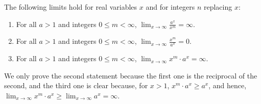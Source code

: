 \begin{tcolorbox}[title=\textcolor{black}{Proof of Prop.~\ref{thm:ExponentialsAreFast} (Exponentials Grow Faster than any Monomial Function)}, sharp corners, colback=green!30, colframe=green!80!blue, %
fonttitle=\bfseries]

The following limits hold for real variables $x$ and for integers $n$ replacing $x$: 
\begin{enumerate}
\renewcommand{\labelenumi}{(\alph{enumi})}
\setlength{\itemsep}{.2cm}
    \item For all $a>1$ and integers $0 \le m < \infty$, $\displaystyle{\lim_{x \to \infty}} \frac{a^x}{x^m} = \infty$.
     \item For all $a > 1$ and integers $0 \le m < \infty$, $\displaystyle{\lim_{x \to \infty}}  \frac{x^m}{a^x} = 0$.
    \item For all $a > 1$ and integers $0 \le m < \infty$, $\displaystyle{\lim_{x \to \infty}}  {x^m} \cdot {a^x} = \infty$.
\end{enumerate}
\end{tcolorbox}

\bigskip

We only prove the second statement because the first one is the reciprocal of the second, and the third one is clear because, for $x>1$, $ {x^m} \cdot {a^x} \ge a^x$, and hence, $\displaystyle{\lim_{x \to \infty}}  {x^m} \cdot {a^x} \ge  \displaystyle{\lim_{x \to \infty}} {a^x} = \infty$. \\


